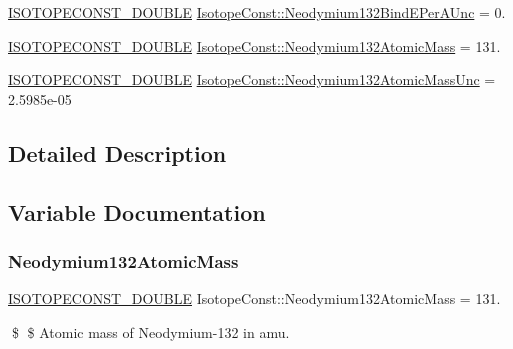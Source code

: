 \begin{DoxyCompactItemize}
\mbox{\hyperlink{group___isotope_const-_macros_ga8f45a7272ce02c0b4c65c44636ed719a}{I\+S\+O\+T\+O\+P\+E\+C\+O\+N\+S\+T\+\_\+\+D\+O\+U\+B\+LE}} \mbox{\hyperlink{group___isotope_const-_neodymium-_nd132_gaf9f705406e0d38f27f51f1116a0bfd44}{Isotope\+Const\+::\+Neodymium132\+Bind\+E\+Per\+A\+Unc}} = 0.
\item 
\mbox{\hyperlink{group___isotope_const-_macros_ga8f45a7272ce02c0b4c65c44636ed719a}{I\+S\+O\+T\+O\+P\+E\+C\+O\+N\+S\+T\+\_\+\+D\+O\+U\+B\+LE}} \mbox{\hyperlink{group___isotope_const-_neodymium-_nd132_gad30ff6ed11772d9ddb34dbdacdf0e45e}{Isotope\+Const\+::\+Neodymium132\+Atomic\+Mass}} = 131.
\item 
\mbox{\hyperlink{group___isotope_const-_macros_ga8f45a7272ce02c0b4c65c44636ed719a}{I\+S\+O\+T\+O\+P\+E\+C\+O\+N\+S\+T\+\_\+\+D\+O\+U\+B\+LE}} \mbox{\hyperlink{group___isotope_const-_neodymium-_nd132_gaa11c5160fe8ef64eaf70aaf53506ff59}{Isotope\+Const\+::\+Neodymium132\+Atomic\+Mass\+Unc}} = 2.\+5985e-\/05
\end{DoxyCompactItemize}


\subsection{Detailed Description}


\subsection{Variable Documentation}
\mbox{\label{group___isotope_const-_neodymium-_nd132_gad30ff6ed11772d9ddb34dbdacdf0e45e}} 
\subsubsection{\texorpdfstring{Neodymium132\+Atomic\+Mass}{Neodymium132AtomicMass}}
{\footnotesize\ttfamily \mbox{\hyperlink{group___isotope_const-_macros_ga8f45a7272ce02c0b4c65c44636ed719a}{I\+S\+O\+T\+O\+P\+E\+C\+O\+N\+S\+T\+\_\+\+D\+O\+U\+B\+LE}} Isotope\+Const\+::\+Neodymium132\+Atomic\+Mass = 131.}

\$ \$ Atomic mass of Neodymium-\/132 in amu. \mbox{\label{group___isotope_const-_neodymium-_nd132_gaa11c5160fe8ef64eaf70aaf53506ff59}} 
